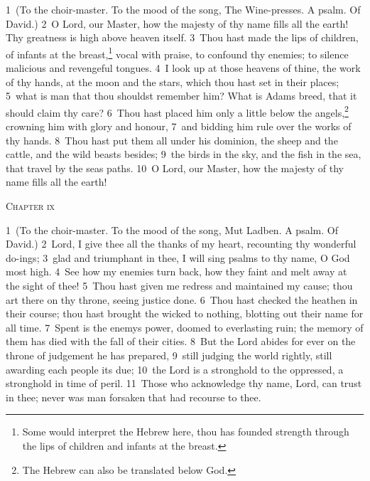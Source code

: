 \documentclass[10pt]{book} %
\begin{document}
\textcolor{benred8}{1}~(To the choir-master. To the mood of the song, The Wine-presses. A psalm. Of David.)
\textcolor{benred8}{2}~O Lord, our Master, how the majesty of thy name fills all the earth! Thy greatness is high above heaven itself. \textcolor{benred8}{3}~Thou hast made the lips of children, of infants at the breast,\footnote[1]{Some would interpret the Hebrew here, \textasciigrave thou has founded strength through the lips of children and infants at the breast\textquotesingle .} vocal with praise, to confound thy enemies; to silence malicious and revengeful tongues. \textcolor{benred8}{4}~I look up at those heavens of thine, the work of thy hands, at the moon and the stars, which thou hast set in their places; \textcolor{benred8}{5}~what is man that thou shouldst remember him? What is Adam\textquotesingle s breed, that it should claim thy care? \textcolor{benred8}{6}~Thou hast placed him only a little below the angels,\footnote[2]{The Hebrew can also be translated \textasciigrave below God\textquotesingle .} crowning him with glory and honour, \textcolor{benred8}{7}~and bidding him rule over the works of thy hands. \textcolor{benred8}{8}~Thou hast put them all under his dominion, the sheep and the cattle, and the wild beasts besides; \textcolor{benred8}{9}~the birds in the sky, and the fish in the sea, that travel by the sea\textquotesingle s paths. \textcolor{benred8}{10}~O Lord, our Master, how the majesty of thy name fills all the earth!
\begin{large}\begin{center}\textsc{Chapter ix}\end{center}\end{large}
\textcolor{benred8}{1}~(To the choir-master. To the mood of the song, Mut Ladben. A psalm. Of David.)
\textcolor{benred8}{2}~Lord, I give thee all the thanks of my heart, recounting thy wonderful do-ings; \textcolor{benred8}{3}~glad and triumphant in thee, I will sing psalms to thy name, O God most high. \textcolor{benred8}{4}~See how my enemies turn back, how they faint and melt away at the sight of thee! \textcolor{benred8}{5}~Thou hast given me redress and maintained my cause; thou art there on thy throne, seeing justice done. \textcolor{benred8}{6}~Thou hast checked the heathen in their course; thou hast brought the wicked to nothing, blotting out their name for all time. \textcolor{benred8}{7}~Spent is the enemy\textquotesingle s power, doomed to everlasting ruin; the memory of them has died with the fall of their cities. \textcolor{benred8}{8}~But the Lord abides for ever on the throne of judgement he has prepared, \textcolor{benred8}{9}~still judging the world rightly, still awarding each people its due; \textcolor{benred8}{10}~the Lord is a stronghold to the oppressed, a stronghold in time of peril. \textcolor{benred8}{11}~Those who acknowledge thy name, Lord, can trust in thee; never was man forsaken that had recourse to thee.
\end{document}
